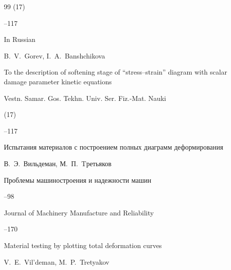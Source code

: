 \begin{thebibliography}{99}
(17)

--117



\misctransl

\lang In Russian

\by B.~V.~Gorev, I.~A.~Banshchikova

\paper To the description of softening stage of ``stress--strain'' diagram with scalar damage parameter kinetic equations

\jour Vestn. Samar. Gos. Tekhn. Univ. Ser. Fiz.-Mat. Nauki


(17)

--117






\paper Испытания материалов с построением полных диаграмм деформирования 

\by В.~Э.~Вильдеман, М.~П.~Tретьяков

\jour Проблемы машиностроения и надежности машин



--98


\transl 



\jour Journal of Machinery Manufacture and Reliability




--170

\paper  Material testing by plotting total deformation curves

\by V.~E.~Vil'deman, M.~P.~Tretyakov 









\end{thebibliography}
